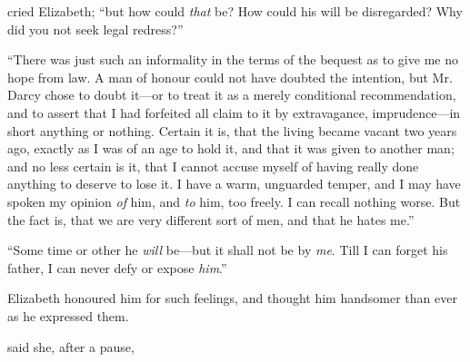 

 cried Elizabeth; “but how could {\em that} be? How could his will be disregarded? Why did you not seek legal redress?”

“There was just such an informality in the terms of the bequest as to give me no hope from law. A man of honour could not have doubted the intention, but Mr. Darcy chose to doubt it---or to treat it as a merely conditional recommendation, and to assert that I had forfeited all claim to it by extravagance, imprudence---in short anything or nothing. Certain it is, that the living became vacant two years ago, exactly as I was of an age to hold it, and that it was given to another man; and no less certain is it, that I cannot accuse myself of having really done anything to deserve to lose it. I have a warm, unguarded temper, and I may have spoken my opinion {\em of} him, and {\em to} him, too freely. I can recall nothing worse. But the fact is, that we are very different sort of men, and that he hates me.”


“Some time or other he {\em will} be---but it shall not be by {\em me}. Till I can forget his father, I can never defy or expose {\em him}.”

Elizabeth honoured him for such feelings, and thought him handsomer than ever as he expressed them.

 said she, after a pause, 



